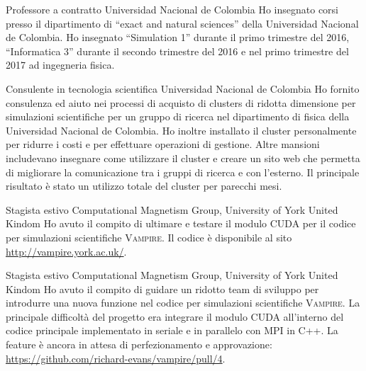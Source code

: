 \documentclass[12pt,english]{moderncv}
\begin{document}
        {Professore a contratto}
        {Universidad Nacional de Colombia}
        {}
        {}
        {%
            Ho insegnato corsi presso il dipartimento di ``exact and natural sciences'' della Universidad Nacional de Colombia.
            Ho insegnato ``Simulation 1'' durante il primo trimestre del 2016, ``Informatica 3'' durante il secondo trimestre del 2016 e nel primo trimestre del 2017 ad ingegneria fisica.
        }

        {Consulente in tecnologia scientifica}
        {Universidad Nacional de Colombia}
        {}
        {}
        {%
            Ho fornito consulenza ed aiuto nei processi di acquisto di clusters di ridotta dimensione per simulazioni scientifiche per un gruppo di ricerca nel dipartimento di fisica della Universidad Nacional de Colombia. 
            Ho inoltre installato il cluster personalmente per ridurre i costi e per effettuare operazioni di gestione.
            Altre mansioni includevano insegnare come utilizzare il cluster e creare un sito web che permetta di migliorare la comunicazione tra i gruppi di ricerca e con l'esterno. 
            Il principale risultato \`e stato un utilizzo totale del cluster per parecchi mesi.
        }

        {Stagista estivo}
        {Computational Magnetism Group, University of York}
        {United Kindom}
        {}
        {%
            Ho avuto il compito di ultimare e testare il modulo CUDA per il codice per simulazioni scientifiche \textsc{Vampire}. Il codice \`e disponibile al sito \url{http://vampire.york.ac.uk/}.
        }

        {Stagista estivo}
        {Computational Magnetism Group, University of York}
        {United Kindom}
        {}
        {%
            Ho avuto il compito di guidare un ridotto team di sviluppo per introdurre una nuova funzione nel codice per simulazioni scientifiche \textsc{Vampire}.
            La principale difficolt\`a del progetto era integrare il modulo CUDA all'interno del codice principale implementato in seriale e in parallelo con MPI in C++.
            La feature \`e ancora in attesa di perfezionamento e approvazione: \url{https://github.com/richard-evans/vampire/pull/4}.
        }
\end{document}
